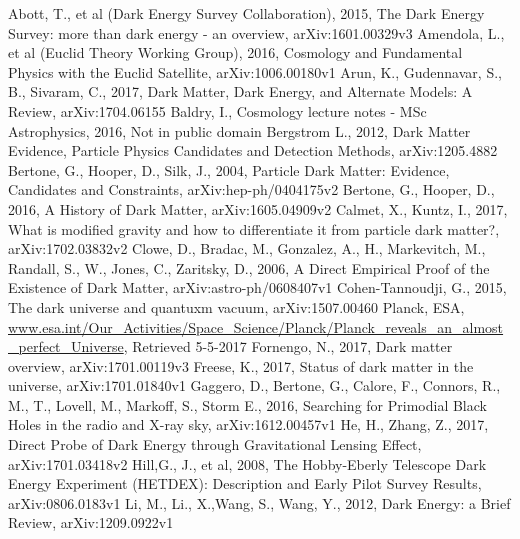 \documentclass[a4paper,12pt]{article}
\begin{document}
\begin{thebibliography}{1}
Abott, T., et al (Dark Energy Survey Collaboration), 2015, The Dark Energy Survey: more than dark energy - an overview, arXiv:1601.00329v3
Amendola, L., et al (Euclid Theory Working Group), 2016, Cosmology and Fundamental Physics with the Euclid Satellite, arXiv:1006.00180v1
Arun, K., Gudennavar, S., B., Sivaram, C., 2017, Dark Matter, Dark Energy, and Alternate Models: A Review, arXiv:1704.06155
Baldry, I., Cosmology lecture notes - MSc Astrophysics, 2016, Not in public domain
Bergstrom L., 2012,  Dark Matter Evidence, Particle Physics Candidates and Detection Methods, arXiv:1205.4882
Bertone, G., Hooper, D., Silk, J., 2004, Particle Dark Matter: Evidence, Candidates and Constraints, arXiv:hep-ph/0404175v2
Bertone, G., Hooper, D., 2016, A History of Dark Matter, arXiv:1605.04909v2
Calmet, X., Kuntz, I., 2017, What is modified gravity and how to differentiate it from particle dark matter?, arXiv:1702.03832v2
Clowe, D., Bradac, M., Gonzalez, A., H., Markevitch, M., Randall, S., W., Jones, C., Zaritsky, D., 2006, A Direct Empirical Proof of the Existence of Dark Matter, arXiv:astro-ph/0608407v1
Cohen-Tannoudji, G., 2015, The dark universe and quantuxm vacuum, arXiv:1507.00460
Planck, ESA, \url{www.esa.int/Our_Activities/Space_Science/Planck/Planck_reveals_an_almost_perfect_Universe}, Retrieved 5-5-2017
Fornengo, N., 2017, Dark matter overview, arXiv:1701.00119v3
Freese, K., 2017, Status of dark matter in the universe, arXiv:1701.01840v1
Gaggero, D., Bertone, G., Calore, F., Connors, R., M., T., Lovell, M., Markoff, S., Storm E., 2016, Searching for Primodial Black Holes in the radio and X-ray sky, arXiv:1612.00457v1
He, H., Zhang, Z., 2017, Direct Probe of Dark Energy through Gravitational Lensing Effect, arXiv:1701.03418v2
Hill,G., J., et al, 2008, The Hobby-Eberly Telescope Dark Energy Experiment (HETDEX): Description and Early Pilot Survey Results, arXiv:0806.0183v1
Li, M., Li., X.,Wang, S., Wang, Y., 2012, Dark Energy: a Brief Review, arXiv:1209.0922v1

\end{thebibliography}
\end{document}
